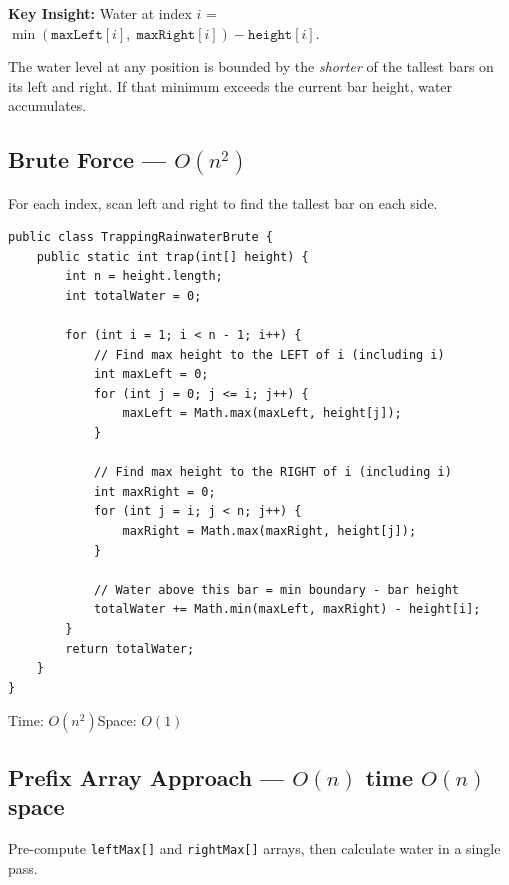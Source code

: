 \documentclass[12pt,a4paper,oneside]{book}
\begin{document}
\textbf{Key Insight:} Water at index $i$ = $\min(\texttt{maxLeft}[i],\; \texttt{maxRight}[i]) - \texttt{height}[i]$.

The water level at any position is bounded by the \textit{shorter} of the tallest bars on its left and right. If that minimum exceeds the current bar height, water accumulates.

\subsection{Brute Force --- $O(n^2)$}

For each index, scan left and right to find the tallest bar on each side.

\begin{lstlisting}[caption={Trapping Rainwater --- Brute Force O(n$^2$)}]
public class TrappingRainwaterBrute {
    public static int trap(int[] height) {
        int n = height.length;
        int totalWater = 0;

        for (int i = 1; i < n - 1; i++) {
            // Find max height to the LEFT of i (including i)
            int maxLeft = 0;
            for (int j = 0; j <= i; j++) {
                maxLeft = Math.max(maxLeft, height[j]);
            }

            // Find max height to the RIGHT of i (including i)
            int maxRight = 0;
            for (int j = i; j < n; j++) {
                maxRight = Math.max(maxRight, height[j]);
            }

            // Water above this bar = min boundary - bar height
            totalWater += Math.min(maxLeft, maxRight) - height[i];
        }
        return totalWater;
    }
}
\end{lstlisting}

\begin{complexity}
Time: $O(n^2)$\quad Space: $O(1)$
\end{complexity}

\subsection{Prefix Array Approach --- $O(n)$ time $O(n)$ space}

Pre-compute \texttt{leftMax[]} and \texttt{rightMax[]} arrays, then calculate water in a single pass.
\end{document}
